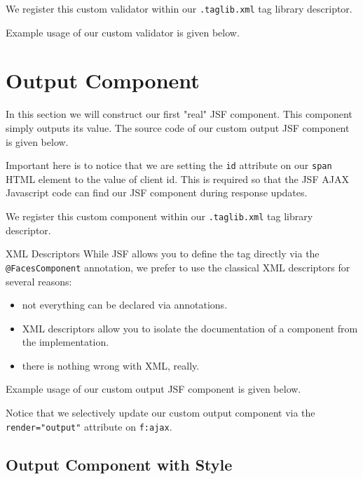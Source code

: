 We register this custom validator within our \texttt{.taglib.xml} tag library descriptor.


Example usage of our custom validator is given below.


\section{Output Component}
In this section we will construct our first "real" JSF component.
This component simply outputs its value.
The source code of our custom output JSF component is given below.

Important here is to notice that we are setting the \texttt{id} attribute on our \texttt{span} HTML element to the value of client id.
This is required so that the JSF AJAX Javascript code can find our JSF component during response updates.

We register this custom component within our \texttt{.taglib.xml} tag library descriptor.


\begin{TIP}{XML Descriptors}
While JSF allows you to define the tag directly via the \texttt{@FacesComponent} annotation,
we prefer to use the classical XML descriptors for several reasons:
\begin{itemize}
	\item not everything can be declared via annotations.
	\item XML descriptors allow you to isolate the documentation of a component from the implementation.
	\item there is nothing wrong with XML, really.
\end{itemize}
\end{TIP}

Example usage of our custom output JSF component is given below.

Notice that we selectively update our custom output component via the \texttt{render="output"} attribute on \texttt{f:ajax}.

\subsection{Output Component with Style}

